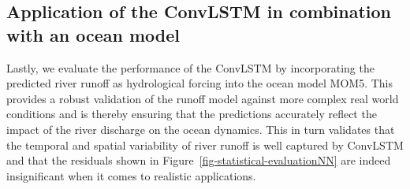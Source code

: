 \documentclass[
]{agujournal2019}
\begin{document}
\begin{figure}


\caption{\label{fig-PerformanceNeuralNetworkRunoff}}

\end{figure}%

\subsection{Application of the ConvLSTM in combination with an ocean
model}\label{sec-MOM-application}

Lastly, we evaluate the performance of the ConvLSTM by incorporating the
predicted river runoff as hydrological forcing into the ocean model
MOM5. This provides a robust validation of the runoff model against more
complex real world conditions and is thereby ensuring that the
predictions accurately reflect the impact of the river discharge on the
ocean dynamics. This in turn validates that the temporal and spatial
variability of river runoff is well captured by ConvLSTM and that the
residuals shown in Figure~\ref{fig-statistical-evaluationNN} are indeed
insignificant when it comes to realistic applications.
\end{document}
